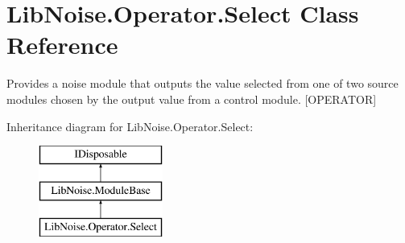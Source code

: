 \hypertarget{class_lib_noise_1_1_operator_1_1_select}{}\section{Lib\+Noise.\+Operator.\+Select Class Reference}
\label{class_lib_noise_1_1_operator_1_1_select}


Provides a noise module that outputs the value selected from one of two source modules chosen by the output value from a control module. \mbox{[}O\+P\+E\+R\+A\+T\+OR\mbox{]}  


Inheritance diagram for Lib\+Noise.\+Operator.\+Select\+:\begin{figure}[H]
\begin{center}
\leavevmode
\includegraphics[height=3.000000cm]{class_lib_noise_1_1_operator_1_1_select}
\end{center}
\end{figure}
